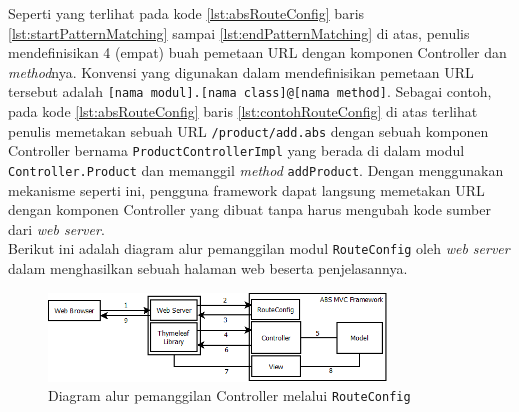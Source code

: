 Seperti yang terlihat pada kode \ref{lst:absRouteConfig} baris \ref{lst:startPatternMatching} sampai \ref{lst:endPatternMatching} di atas, penulis mendefinisikan 4 (empat) buah pemetaan URL dengan komponen Controller dan \textit{method}nya. Konvensi yang digunakan dalam mendefinisikan pemetaan URL tersebut adalah \texttt{[nama modul].[nama class]@[nama method]}. Sebagai contoh, pada kode \ref{lst:absRouteConfig} baris \ref{lst:contohRouteConfig} di atas terlihat penulis memetakan sebuah URL \texttt{/product/add.abs} dengan sebuah komponen Controller bernama \texttt{ProductControllerImpl} yang berada di dalam modul \texttt{Controller.Product} dan memanggil \textit{method} \texttt{addProduct}. Dengan menggunakan mekanisme seperti ini, pengguna framework dapat langsung memetakan URL dengan komponen Controller yang dibuat tanpa harus mengubah kode sumber dari \textit{web server}.\\

Berikut ini adalah diagram alur pemanggilan modul \texttt{RouteConfig} oleh \textit{web server} dalam menghasilkan sebuah halaman web beserta penjelasannya.

\begin{figure}
    \centering
    \includegraphics[width=0.8\textwidth]{img/absmvc_flow.png}
    \caption{Diagram alur pemanggilan Controller melalui \texttt{RouteConfig}}
    \label{fig:diagramABSMVCRouteConfig}
\end{figure}

